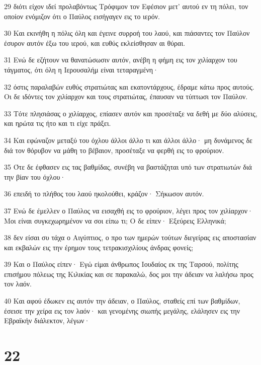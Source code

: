 \par 29 διότι είχον ιδεί προλαβόντως Τρόφιμον τον Εφέσιον μετ' αυτού εν τη πόλει, τον οποίον ενόμιζον ότι ο Παύλος εισήγαγεν εις το ιερόν.
\par 30 Και εκινήθη η πόλις όλη και έγεινε συρροή του λαού, και πιάσαντες τον Παύλον έσυρον αυτόν έξω του ιερού, και ευθύς εκλείσθησαν αι θύραι.
\par 31 Ενώ δε εζήτουν να θανατώσωσιν αυτόν, ανέβη η φήμη εις τον χιλίαρχον του τάγματος, ότι όλη η Ιερουσαλήμ είναι τεταραγμένη·
\par 32 όστις παραλαβών ευθύς στρατιώτας και εκατοντάρχους, έδραμε κάτω προς αυτούς. Οι δε ιδόντες τον χιλίαρχον και τους στρατιώτας, έπαυσαν να τύπτωσι τον Παύλον.
\par 33 Τότε πλησιάσας ο χιλίαρχος, επίασεν αυτόν και προσέταξε να δεθή με δύο αλύσεις, και ηρώτα τις ήτο και τι είχε πράξει.
\par 34 Και εφώναζον μεταξύ του όχλου άλλοι άλλο τι και άλλοι άλλο· μη δυνάμενος δε διά τον θόρυβον να μάθη το βέβαιον, προσέταξε να φερθή εις το φρούριον.
\par 35 Ότε δε έφθασεν εις τας βαθμίδας, συνέβη να βαστάζηται υπό των στρατιωτών διά την βίαν του όχλου·
\par 36 επειδή το πλήθος του λαού ηκολούθει, κράζον· Σήκωσον αυτόν.
\par 37 Ενώ δε έμελλεν ο Παύλος να εισαχθή εις το φρούριον, λέγει προς τον χιλίαρχον· Μοι είναι συγκεχωρημένον να σοι είπω τι; Ο δε είπεν· Εξεύρεις Ελληνικά;
\par 38 δεν είσαι συ τάχα ο Αιγύπτιος, ο προ των ημερών τούτων διεγείρας εις αποστασίαν και εκβαλών εις την έρημον τους τετρακισχιλίους άνδρας φονείς;
\par 39 Και ο Παύλος είπεν· Εγώ είμαι άνθρωπος Ιουδαίος εκ της Ταρσού, πολίτης επισήμου πόλεως της Κιλικίας και σε παρακαλώ, δος μοι την άδειαν να λαλήσω προς τον λαόν.
\par 40 Και αφού έδωκεν εις αυτόν την άδειαν, ο Παύλος, σταθείς επί των βαθμίδων, έσεισε την χείρα εις τον λαόν· και γενομένης σιωπής μεγάλης, ελάλησεν εις την Εβραϊκήν διάλεκτον, λέγων·

\chapter{22}

